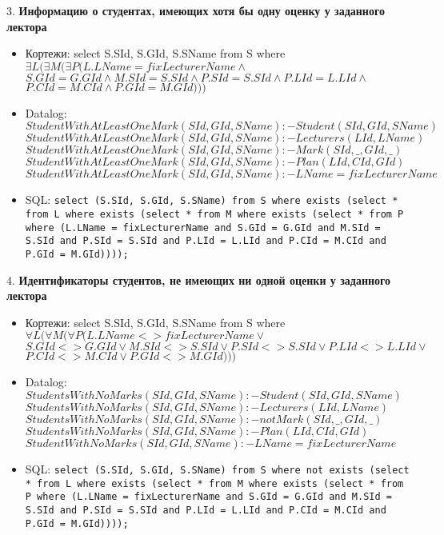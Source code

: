 \documentclass[11pt,a4paper,oneside]{article}
\begin{document}
3. \textbf{Информацию о студентах, имеющих хотя бы одну оценку у заданного лектора}
\begin{itemize}
\item Кортежи: select S.SId, S.GId, S.SName from S where $\exists L (\exists M (\exists P (L.LName = fixLecturerName \land$ $S.GId = G.GId \land M.SId = S.SId \land P.SId = S.SId \land P.LId = L.LId \land$ $P.CId = M.CId \land P.GId = M.GId)))$
\item Datalog:
$StudentWithAtLeastOneMark(SId, GId, SName) :- Student(SId, GId, SName)$
\newline
$StudentWithAtLeastOneMark(SId, GId, SName) :- Lecturers(LId, LName)$
\newline
$StudentWithAtLeastOneMark(SId, GId, SName) :- Mark(SId, \_, GId, \_)$
\newline
$StudentWithAtLeastOneMark(SId, GId, SName) :- Plan(LId, CId, GId)$
\newline
$StudentWithAtLeastOneMark(SId, GId, SName) :- LName = fixLecturerName$

\item SQL: \texttt{select (S.SId, S.GId, S.SName) from S where exists (select * from L where exists (select * from M where exists (select * from P where (L.LName = fixLecturerName and S.GId = G.GId and M.SId = S.SId and P.SId = S.SId and P.LId = L.LId and P.CId = M.CId and P.GId = M.GId))));}
\end{itemize}

4. \textbf{Идентификаторы студентов, не имеющих ни одной оценки у заданного лектора}
\begin{itemize}
\item Кортежи: select S.SId, S.GId, S.SName from S where $\forall L (\forall M (\forall P (L.LName <> fixLecturerName \lor$ $S.GId <> G.GId \lor M.SId <> S.SId \lor P.SId <> S.SId \lor P.LId <> L.LId \lor$ $P.CId <> M.CId \lor P.GId <> M.GId)))$
\item Datalog: 
$StudentsWithNoMarks(SId, GId, SName) :- Student(SId, GId, SName)$
\newline
$StudentsWithNoMarks(SId, GId, SName) :- Lecturers(LId, LName)$
\newline
$StudentsWithNoMarks(SId, GId, SName) :- not Mark(SId, \_, GId, \_)$
\newline
$StudentsWithNoMarks(SId, GId, SName) :- Plan(LId, CId, GId)$
\newline
$StudentWithNoMarks(SId, GId, SName) :- LName = fixLecturerName$

\item SQL: \texttt{select (S.SId, S.GId, S.SName) from S where not exists (select * from L where exists (select * from M where exists (select * from P where (L.LName = fixLecturerName and S.GId = G.GId and M.SId = S.SId and P.SId = S.SId and P.LId = L.LId and P.CId = M.CId and P.GId = M.GId))));}
\end{itemize}
\end{document}
